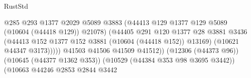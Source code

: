 \begin{lexlean}{RustStd}
\begin{coremodule}
                                                          @285
                                                          @293
                                                          @1377
                                                          @2029
                                                          @5089
                                                          @3883
                                                          (@44413
                                                            @129
                                                            @1377
                                                            @129
                                                            @5089
                                                            (@10604 (@44418 @129))
                                                            @21078)
                                                          (@44405
                                                            @291
                                                            @120
                                                            @1377
                                                            @28
                                                            @3881
                                                            @3436
                                                            (@44413
                                                              @152
                                                              @1377
                                                              @152
                                                              @3881
                                                              (@10604 (@44418 @152))
                                                              @13169)
                                                            (@10621 @44347 @3173)))))
                                                    @41503
                                                    @41506
                                                    @41509
                                                    @41512))
                                                (@12306 (@44373 @96))
                                                (@10645 (@44377 @1362 @353))
                                                (@10529 (@44384 @353 @98 @3695 @3442))
                                                (@10663
                                                  @44246
                                                  @2853
                                                  @2844
                                                  @3442

\end{coremodule}
\end{lexlean}
